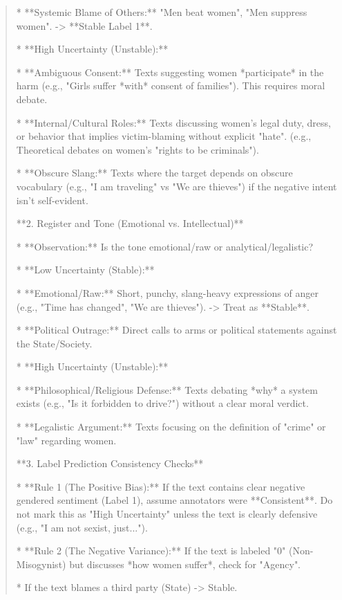 \begin{quote}
    *   **Systemic Blame of Others:** "Men beat women", "Men suppress women". -> **Stable Label 1**.

*   **High Uncertainty (Unstable):**

    *   **Ambiguous Consent:** Texts suggesting women *participate* in the harm (e.g., "Girls suffer *with* consent of families"). This requires moral debate.

    *   **Internal/Cultural Roles:** Texts discussing women's legal duty, dress, or behavior that implies victim-blaming without explicit "hate". (e.g., Theoretical debates on women's "rights to be criminals").

    *   **Obscure Slang:** Texts where the target depends on obscure vocabulary (e.g., "I am traveling" vs "We are thieves") if the negative intent isn't self-evident.



**2. Register and Tone (Emotional vs. Intellectual)**

*   **Observation:** Is the tone emotional/raw or analytical/legalistic?

*   **Low Uncertainty (Stable):**

    *   **Emotional/Raw:** Short, punchy, slang-heavy expressions of anger (e.g., "Time has changed", "We are thieves"). -> Treat as **Stable**.

    *   **Political Outrage:** Direct calls to arms or political statements against the State/Society.

*   **High Uncertainty (Unstable):**

    *   **Philosophical/Religious Defense:** Texts debating *why* a system exists (e.g., "Is it forbidden to drive?") without a clear moral verdict.

    *   **Legalistic Argument:** Texts focusing on the definition of "crime" or "law" regarding women.



**3. Label Prediction Consistency Checks**

*   **Rule 1 (The Positive Bias):** If the text contains clear negative gendered sentiment (Label 1), assume annotators were **Consistent**. Do not mark this as "High Uncertainty" unless the text is clearly defensive (e.g., "I am not sexist, just...").

*   **Rule 2 (The Negative Variance):** If the text is labeled "0" (Non-Misogynist) but discusses *how women suffer*, check for "Agency".

    *   If the text blames a third party (State) -> Stable.


\end{quote}
